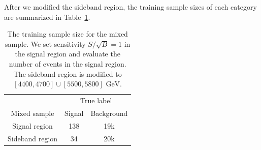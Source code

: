 \documentclass[12pt]{article}
\begin{document}
		After we modified the sideband region, the training sample sizes of each category are summarized in Table~\ref{tab:training_sample_size_cwola_hunting_hv_new_SB}.
		\begin{table}[htpb]
			\centering
			\caption{The training sample size for the mixed sample. We set sensitivity $S / \sqrt{B} = 1$ in the signal region and evaluate the number of events in the signal region. The sideband region is modified to $[4400,4700] \cup [5500,5800] \text{ GeV}$.}
			\label{tab:training_sample_size_cwola_hunting_hv_new_SB}
			\begin{tabular}{c|cc}
								& \multicolumn{2}{c}{True label} \\
				Mixed sample    & Signal       & Background      \\ \hline
				Signal region   & 138          & 19k             \\
				Sideband region & 34           & 20k
			\end{tabular}
		\end{table}
\end{document}
